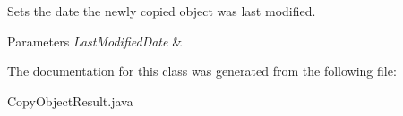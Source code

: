 Sets the date the newly copied object was last modified. 


\begin{DoxyParams}{Parameters}
{\em Last\+Modified\+Date} & \\
\hline
\end{DoxyParams}


The documentation for this class was generated from the following file\+:\begin{DoxyCompactItemize}
\item 
Copy\+Object\+Result.\+java\end{DoxyCompactItemize}
